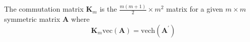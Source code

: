 The commutation matrix $\mathbf{K}_{m}$ is the
$\frac{m \left( m + 1 \right)}{2} \times m^2$
matrix
for a given $m \times m$ symmetric matrix $\mathbf{A}$
where
\begin{equation}
   \mathbf{K}_{m} \mathrm{vec} \left( \mathbf{A} \right)
   =
   \mathrm{vech} \left( \mathbf{A}^{\prime} \right)
\end{equation}